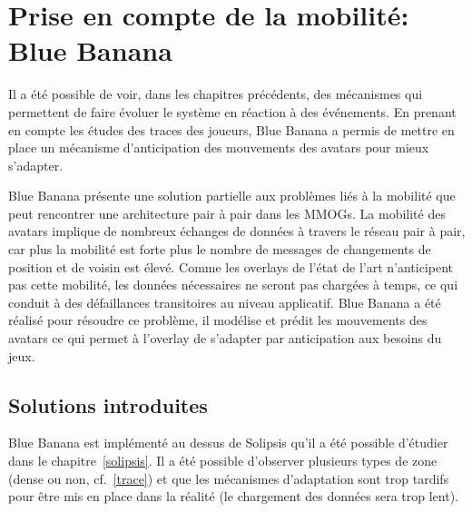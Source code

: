 \section{Prise en compte de la mobilité: Blue Banana}
	\label{BlueBanana}
	Il a été possible de voir, dans les chapitres précédents, des mécanismes qui permettent de faire évoluer le système en réaction à des événements. En prenant en compte les études des traces des joueurs, Blue Banana a permis de mettre en place un mécanisme d'anticipation des mouvements des avatars pour mieux s'adapter.
	\par Blue Banana présente une solution partielle aux problèmes liés à la mobilité que peut rencontrer une architecture pair à pair dans les MMOGs. La mobilité des avatars implique de nombreux échanges de données à travers le réseau pair à pair, car plus la mobilité est forte plus le nombre de messages de changements de position et de voisin est élevé. Comme les overlays de l'état de l'art n'anticipent pas cette mobilité, les données nécessaires ne seront pas chargées à temps, ce qui conduit à des défaillances transitoires au niveau applicatif. Blue Banana a été réalisé pour résoudre ce problème, il modélise et prédit les mouvements des avatars ce qui permet à l'overlay de s'adapter par anticipation aux besoins du jeux.
	\subsection{Solutions introduites}
	Blue Banana est implémenté au dessus de Solipsis qu'il a été possible d'étudier dans le chapitre~\ref{solipsis}. Il a été possible d'observer plusieurs types de zone (dense ou non, cf.~\ref{trace}) et que les mécanismes d'adaptation sont trop tardifs pour être mis en place dans la réalité (le chargement des données sera trop lent).
